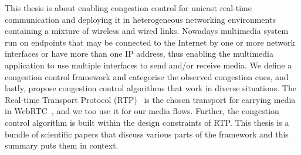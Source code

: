 This thesis is about enabling congestion control for unicast real-time
communication and deploying it in heterogeneous networking environments
containing a mixture of wireless and wired links. Nowadays multimedia system
run on endpoints that may be connected to the Internet by one or more network
interfaces or have more  than one IP address, thus enabling the multimedia
application to use multiple interfaces to send and/or receive media.  We
define a congestion control framework and categorise the observed congestion
cues, and lastly, propose congestion control algorithms that work in diverse
situations. The Real-time Transport Protocol (RTP)~\cite{rfc3550} is the
chosen transport for carrying media in WebRTC~\cite{draft.rtcweb.transport},
and we too use it for our media flows. Further, the congestion control
algorithm is built within the design constraints of RTP. This thesis is a
bundle of scientific papers that  discuss various parts of the framework and
this summary puts them in context.





